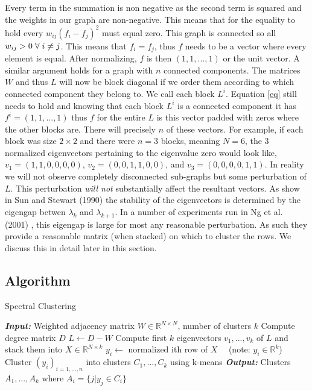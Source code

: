 \documentclass[a4paper]{article}
\begin{document}
\begin{multicols}{2}
Every term in the summation is non negative as the second term is squared and the weights in our graph are non-negative. This means that for the equality to hold every $w_{ij}(f_i - f_j)^2$ must equal zero. This graph is connected so all $w_{ij} > 0 \hspace{0.1cm} \forall \hspace{0.1cm} i \neq j$. This means that $f_i=f_j$, thus $f$ needs to be a vector where every element is equal. After normalizing, $f$ is then $(1, 1, ..., 1)$ or the unit vector. A similar argument holds for a graph with $n$ connected components. The matrices $W$ and thus $L$ will now be block diagonal if we order them according to which connected component they belong to. We call each block $L^i$. Equation \ref{eq} still needs to hold and knowing that each block $L^i$ is a connected component it has $f^i = (1, 1, ..., 1)$ thus $f$ for the entire $L$ is this vector padded with zeros where the other blocks are. There will precisely $n$ of these vectors. For example, if each block was size $2 \times 2$ and there were $n=3$ blocks, meaning $N=6$, the 3 normalized eigenvectors pertaining to the eigenvalue zero would look like, $v_1 = (1, 1, 0, 0, 0, 0)$, $v_2 = (0 ,0, 1, 1, 0, 0)$, and $v_3 = (0, 0, 0, 0, 1, 1)$. In reality we will not observe completely disconnected sub-graphs but some perturbation of $L$. This perturbation \textit{will not} substantially affect the resultant vectors. As show in Sun and Stewart (1990) \cite{perturb} the stability of the eigenvectors is determined by the eigengap betwen $\lambda_k$ and $\lambda_{k+1}$. 
In a number of experiments run in Ng et al. (2001) \cite{ng}, this eigengap is large for most any reasonable perturbation. As such they provide a reasonable matrix (when stacked) on which to cluster the rows. We discuss this in detail later in this section.
\end{multicols}

\subsection{Algorithm}
\begin{algorithm}[H]
\caption{Spectral Clustering}\label{spectralalg}
\begin{algorithmic}[H]
\State \textbf{\textit{Input:}} Weighted adjacency matrix $W \in \mathbb{R}^{N \times N}$, number of clusters $k$
\State Compute degree matrix $D$
\State $L \gets D - W$ 
\State Compute first $k$ eigenvectors $v_1, ..., v_k$  of $L$ and stack them into $X \in \mathbb{R}^{N \times k}$
\State $y_i \gets$ normalized ith row of $X \quad$   (note: $y_i \in \mathbb{R}^{k}$)
\State Cluster $(y_i)_{i=1,...,n}$ into clusters $C_1, ..., C_k$ using k-means
\State \textbf{\textit{Output:}} Clusters $A_1,...,A_k$ where $A_i = \{j | y_j \in C_i \}$
\end{algorithmic}
\end{algorithm}
\end{document}
